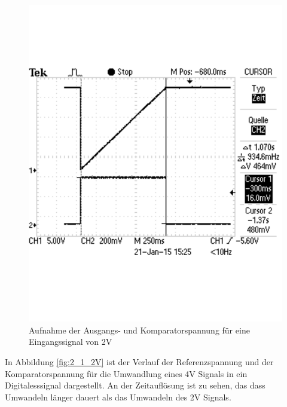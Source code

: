 \documentclass[12pt,a4paper]{article}
\begin{document}
\begin{figure}[H]
  \centering 	
    \includegraphics[trim = 0mm 50mm 0mm 50mm, clip, scale = 0.4]{2_1_4V.pdf}
  	\caption[Aufnahme der Ausgangs- und Komparatorspannung für eine Eingangssignal von 2V]{Aufnahme der Ausgangs- und Komparatorspannung für eine Eingangssignal von 2V} 
  \label{fig:2_1_4V}
\end{figure}

In Abbildung \ref{fig:2_1_2V} ist der Verlauf der Referenzspannung und der Komparatorspannung für die Umwandlung eines 4V Signals in ein Digitalesssignal dargestellt. An der Zeitauflösung ist zu sehen, das dass Umwandeln länger dauert als das Umwandeln des 2V Signals.
\end{document}
